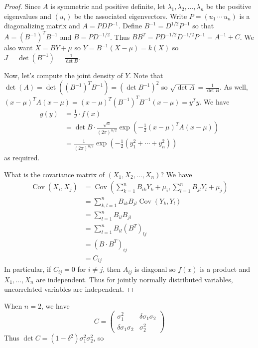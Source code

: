 \documentclass[12pt, a4paper]{book}
\DeclareMathOperator{\Cov}{Cov}
\theoremstyle{nonumberplain}
\newtheorem{proof}{Proof}
\begin{document}
\begin{proof}
    Since $A$ is symmetric and positive definite, let $\lambda_1,\lambda_2,\ldots,\lambda_n$ be the positive eigenvalues and $(u_i)$ be the associated eigenvectors.
    Write $P=(u_1\,\cdots\, u_n)$ is a diagonalizing matrix and $A=PDP^{-1}$.
    Define $B^{-1}=D^{1/2}P^{-1}$ so that $A=(B^{-1})^TB^{-1}$ and $B=PD^{-1/2}$.
    Thus $BB^{T}=PD^{-1/2}D^{-1/2}P^{-1}=A^{-1}+C$.
    We also want $X=BY+\mu$ so $Y=B^{-1}(X-\mu)=k(X)$ so $J=\det(B^{-1})=\frac{1}{\det B}$.

    Now, let's compute the joint density of $Y$.
    Note that $\det(A)=\det((B^{-1})^TB^{-1})=(\det B^{-1})^2$ so $\sqrt{\det A}=\frac{1}{\det B}$.
    As well, $(x-\mu)^TA(x-\mu)=(x-\mu)^T(B^{-1})^TB^{-1}(x-\mu)=y^Ty$.
    We have
    \begin{align*}
        g(y) &= \frac{1}{J}\cdot f(x)\\
             &= \det B\cdot\frac{\sqrt{a}}{(2\pi)^{n/2}}\exp\left(-\frac{1}{2}(x-\mu)^TA(x-\mu)\right)\\
             &= \frac{1}{(2\pi)^{n/2}}\exp\left(-\frac{1}{2}(y_1^2+\cdots+y_n^2)\right)
    \end{align*}
    as required.

    What is the covariance matrix of $(X_1,X_2,\ldots,X_n)$?
    We have
    \begin{align*}
        \Cov(X_i,X_j) &= \Cov\left(\sum\limits_{k=1}^n B_{ik}Y_k+\mu_i,\sum\limits_{l=1}^n B_{jl}Y_l+\mu_j\right)\\
                      &= \sum\limits_{k,l=1}^n B_{ik}B_{jl}\Cov(Y_k,Y_l)\\
                      &= \sum\limits_{l=1}^n B_{il}B_{jl}\\
                      &= \sum\limits_{l=1}^n B_{il}(B^T)_{lj}\\
                      &= (B\cdot B^T)_{ij}\\
                      &= C_{ij}
    \end{align*}
    In particular, if $C_{ij}=0$ for $i\neq j$, then $A_{ij}$ is diagonal so $f(x)$ is a product and $X_1,\ldots,X_n$ are independent.
    Thus for jointly normally distributed variables, uncorrelated variables are independent.
\end{proof}
When $n=2$, we have
\[C=\begin{pmatrix}\sigma_1^2&\delta\sigma_1\sigma_2\\\delta\sigma_1\sigma_2&\sigma_2^2\end{pmatrix}\]
Thus $\det C=(1-\delta^2)\sigma_1^2\sigma_2^2$, so
\end{document}
